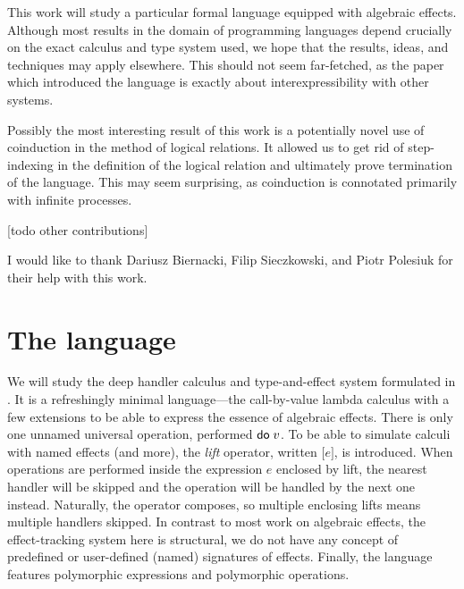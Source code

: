 \documentclass[a4paper, 12pt]{report}
\newcommand{\Do}{\textsf{do\;}}
\newcommand{\Lift}[1]{\boldsymbol{[}#1\boldsymbol{]}}
\newcommand{\+}{\enspace}
\begin{document}
This work will study a particular formal language equipped with algebraic effects.
Although most results in the domain of programming languages depend crucially on the exact calculus and type system used,
we hope that the results, ideas, and techniques may apply elsewhere.
This should not seem far-fetched,
as the paper which introduced the language \cite{fscd19} is exactly about
interexpressibility with other systems.

Possibly the most interesting result of this work is a potentially novel use of coinduction
in the method of logical relations.
It allowed us to get rid of step-indexing in the definition of the logical relation and
ultimately prove termination of the language.
This may seem surprising, as coinduction is connotated primarily with infinite processes.

[todo other contributions]

I would like to thank Dariusz Biernacki, Filip Sieczkowski, and Piotr Polesiuk
for their help with this work.

\chapter{The language}

We will study the deep handler calculus and type-and-effect system formulated
in \cite{fscd19}.
It is a refreshingly minimal language---the call-by-value lambda calculus with a few extensions
to be able to express the essence of algebraic effects.
There is only one unnamed universal operation, performed $\Do v$.
To be able to simulate calculi with named effects (and more),
the \textit{lift} operator, written $\Lift{e}$, is introduced.
When operations are performed inside the expression $e$ enclosed by lift,
the nearest handler will be skipped and the operation will be handled by the next one instead.
Naturally, the operator composes, so multiple enclosing lifts means multiple handlers skipped.
In contrast to most work on algebraic effects, the effect-tracking system here is structural,
we do not have any concept of predefined or user-defined (named) signatures of effects.
Finally, the language features polymorphic expressions and polymorphic operations.
\end{document}
